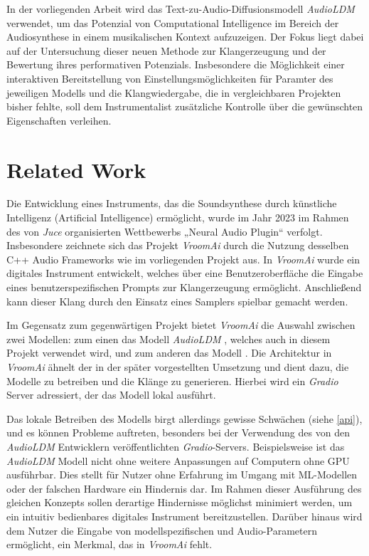 \documentclass[
  a4paper,  %
  twoside,  %
  bibliography=totoc,
  headsepline,
  cleardoublepage=empty,
  parskip=half,
  draft=false
]{scrbook}
\begin{document}
In der vorliegenden Arbeit wird das Text-zu-Audio-Diffusionsmodell \emph{AudioLDM}\cite{liu_audioldm_2023-1} verwendet, um das Potenzial von Computational Intelligence im Bereich der Audiosynthese in einem musikalischen Kontext aufzuzeigen. Der Fokus liegt dabei auf der Untersuchung dieser neuen Methode zur Klangerzeugung und der Bewertung ihres performativen Potenzials. Insbesondere die Möglichkeit einer interaktiven Bereitstellung von Einstellungsmöglichkeiten für Paramter des jeweiligen Modells und die Klangwiedergabe, die in vergleichbaren Projekten bisher fehlte, soll dem Instrumentalist zusätzliche Kontrolle über die gewünschten Eigenschaften verleihen.


\chapter{Related Work}


Die Entwicklung eines Instruments, das die Soundsynthese durch künstliche Intelligenz (Artificial Intelligence) ermöglicht, wurde im Jahr 2023 im Rahmen des von \emph{Juce} \cite{noauthor_juce_nodate-1} organisierten Wettbewerbs „Neural Audio Plugin“ verfolgt. Insbesondere zeichnete sich das Projekt \emph{VroomAi} \cite{barney_hill_vroomai_2023} durch die Nutzung desselben C++ Audio Frameworks wie im vorliegenden Projekt aus. In \emph{VroomAi} wurde ein digitales Instrument entwickelt, welches über eine Benutzeroberfläche die Eingabe eines benutzerspezifischen Prompts zur Klangerzeugung ermöglicht. Anschließend kann dieser Klang durch den Einsatz eines Samplers spielbar gemacht werden.

Im Gegensatz zum gegenwärtigen Projekt bietet \emph{VroomAi} die Auswahl zwischen zwei Modellen: zum einen das Modell \emph{AudioLDM} \cite{liu_audioldm_2023-1}, welches auch in diesem Projekt verwendet wird, und zum anderen das Modell \cite{borsos_audiolm_2022}. Die Architektur in \emph{VroomAi} ähnelt der in der später vorgestellten Umsetzung und dient dazu, die Modelle zu betreiben und die Klänge zu generieren. Hierbei wird ein \emph{Gradio} Server \cite{team_gradio_gradio_nodate} adressiert, der das Modell lokal ausführt.

Das lokale Betreiben des Modells birgt allerdings gewisse Schwächen (siehe \ref{api}), und es können Probleme auftreten, besonders bei der Verwendung des von den \emph{AudioLDM} Entwicklern veröffentlichten \emph{Gradio}-Servers. Beispielsweise ist das \emph{AudioLDM} Modell nicht ohne weitere Anpassungen auf Computern ohne GPU ausführbar. Dies stellt für Nutzer ohne Erfahrung im Umgang mit ML-Modellen oder der falschen Hardware ein Hindernis dar. Im Rahmen dieser Ausführung des gleichen Konzepts sollen derartige Hindernisse möglichst minimiert werden, um ein intuitiv bedienbares digitales Instrument bereitzustellen. Darüber hinaus wird dem Nutzer die Eingabe von modellspezifischen und Audio-Parametern ermöglicht, ein Merkmal, das in \emph{VroomAi} fehlt.
\end{document}
